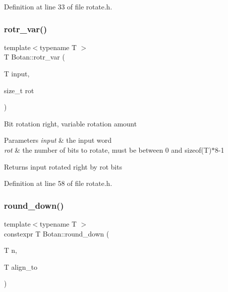 Definition at line 33 of file rotate.\+h.

\mbox{\label{namespace_botan_ae58d929c7e8f311bc908091212d969dd}} 
\subsubsection{\texorpdfstring{rotr\+\_\+var()}{rotr\_var()}}
{\footnotesize\ttfamily template$<$typename T $>$ \\
T Botan\+::rotr\+\_\+var (\begin{DoxyParamCaption}\item[{T}]{input,  }\item[{size\+\_\+t}]{rot }\end{DoxyParamCaption})\hspace{0.3cm}{\ttfamily [inline]}}

Bit rotation right, variable rotation amount 
\begin{DoxyParams}{Parameters}
{\em input} & the input word \\
\hline
{\em rot} & the number of bits to rotate, must be between 0 and sizeof(\+T)$\ast$8-\/1 \\
\hline
\end{DoxyParams}
\begin{DoxyReturn}{Returns}
input rotated right by rot bits 
\end{DoxyReturn}


Definition at line 58 of file rotate.\+h.

\mbox{\label{namespace_botan_a4595be1d36c60aea04cc4fad870956a3}} 
\subsubsection{\texorpdfstring{round\+\_\+down()}{round\_down()}}
{\footnotesize\ttfamily template$<$typename T $>$ \\
constexpr T Botan\+::round\+\_\+down (\begin{DoxyParamCaption}\item[{T}]{n,  }\item[{T}]{align\+\_\+to }\end{DoxyParamCaption})\hspace{0.3cm}{\ttfamily [inline]}}

